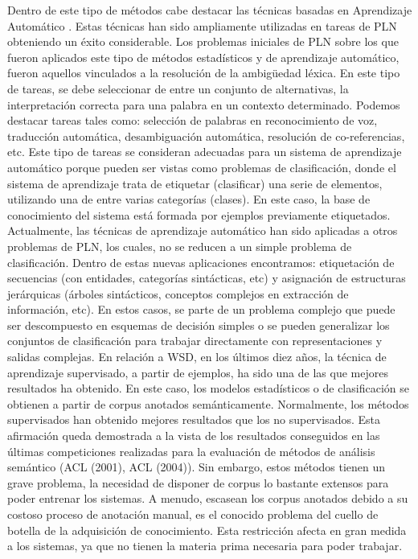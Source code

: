 Dentro de este tipo de métodos cabe destacar las técnicas basadas en Aprendizaje Automático \cite{016}. Estas técnicas han sido ampliamente utilizadas en tareas de PLN obteniendo un éxito considerable. Los problemas iniciales de PLN sobre los que fueron aplicados este tipo de métodos estadísticos y de aprendizaje automático, fueron aquellos vinculados a la resolución de la ambigüedad léxica. En este tipo de tareas, se debe seleccionar de entre un conjunto de alternativas, la interpretación correcta para una palabra en un contexto determinado. Podemos destacar tareas tales como: selección de palabras en reconocimiento de voz, traducción automática, desambiguación automática, resolución de co-referencias, etc. Este tipo de tareas se consideran adecuadas para un sistema de aprendizaje automático porque pueden ser vistas como problemas de clasificación, donde el sistema de aprendizaje trata de etiquetar (clasificar) una serie de elementos, utilizando una de entre varias categorías (clases). En este caso, la base de conocimiento del sistema está formada por ejemplos previamente etiquetados. Actualmente, las técnicas de aprendizaje automático han sido aplicadas a otros problemas de PLN, los cuales, no se reducen a un simple problema de clasificación. Dentro de estas nuevas aplicaciones encontramos: etiquetación de secuencias (con entidades, categorías sintácticas, etc) y asignación de estructuras jerárquicas (árboles sintácticos, conceptos complejos en extracción de información, etc). En estos casos, se parte de un problema complejo que puede ser descompuesto en esquemas de decisión simples o se pueden generalizar los conjuntos de clasificación para trabajar directamente con representaciones y salidas complejas. En relación a WSD, en los últimos diez años, la técnica de aprendizaje supervisado, a partir de ejemplos, ha sido una de las que mejores resultados ha obtenido. En este caso, los modelos estadísticos o de clasificación se obtienen a partir de corpus anotados semánticamente. Normalmente, los métodos supervisados han obtenido mejores resultados que los no supervisados. Esta afirmación queda demostrada a la vista de los resultados conseguidos en las últimas competiciones realizadas para la evaluación de métodos de análisis semántico (ACL (2001), ACL (2004)). Sin embargo, estos métodos tienen un grave problema, la necesidad de disponer de corpus lo bastante extensos para poder entrenar los sistemas. A menudo, escasean los corpus anotados debido a su costoso proceso de anotación manual, es el conocido problema del cuello de botella de la adquisición de conocimiento. Esta restricción afecta en gran medida a los sistemas, ya que no tienen la materia prima necesaria para poder trabajar.

